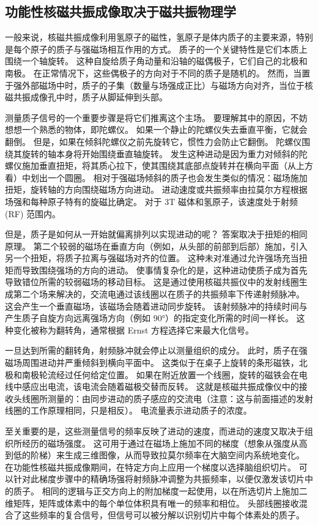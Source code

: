 \subsection{功能性核磁共振成像取决于磁共振物理学}

一般来说，核磁共振成像利用氢原子的磁性，氢原子是体内质子的主要来源，特别是每个原子的质子与强磁场相互作用的方式。
质子的一个关键特性是它们本质上围绕一个轴旋转。
这种自旋给质子角动量和沿轴的磁偶极子，它们自己的北极和南极。
在正常情况下，这些偶极子的方向对于不同的质子是随机的。
然而，当置于强外部磁场中时，质子的子集（数量与场强成正比）与磁场方向对齐，当位于核磁共振成像孔中时，质子从脚延伸到头部。


测量质子信号的一个重要步骤是将它们推离这个主场。 
要理解其中的原因，不妨想想一个熟悉的物体，即陀螺仪。 
如果一个静止的陀螺仪失去垂直平衡，它就会翻倒。 
但是，如果在倾斜陀螺仪之前先旋转它，惯性力会防止它翻倒。 
陀螺仪围绕其旋转的轴本身将开始围绕垂直轴旋转。 
发生这种进动是因为重力对倾斜的陀螺仪施加垂直扭矩，将其质心拉下，使其围绕其底部点旋转并在横向平面（从上方看）中划出一个圆圈。 
相对于强磁场倾斜的质子也会发生类似的情况：磁场施加扭矩，旋转轴的方向围绕磁场方向进动。 
进动速度或共振频率由拉莫尔方程根据场强和每种原子特有的旋磁比确定。 
对于 3T 磁体和氢原子，该速度处于射频 (RF) 范围内。


但是，质子是如何从一开始就偏离排列以实现进动的呢？ 
答案取决于扭矩的相同原理。 
第二个较弱的磁场在垂直方向（例如，从头部的前部到后部）施加，引入另一个扭矩，将质子拉离与强磁场对齐的位置。 
这种未对准通过允许强场充当扭矩而导致围绕强场的方向的进动。 
使事情复杂化的是，这种进动使质子成为首先导致错位所需的较弱磁场的移动目标。
这是通过使用核磁共振仪中的发射线圈生成第二个场来解决的，交流电通过该线圈以在质子的共振频率下传递射频脉冲。 
这会产生一个垂直磁场，该磁场会随着进动同步旋转。 
该射频脉冲的持续时间与产生质子自旋方向远离强场方向（例如 90°）的指定变化所需的时间一样长。 
这种变化被称为翻转角，通常根据 Ernst 方程选择它来最大化信号。


一旦达到所需的翻转角，射频脉冲就会停止以测量组织的成分。
此时，质子在强磁场周围进动并严重倾斜到横向平面中。 
这类似于在桌子上旋转的条形磁铁，北极和南极轮流经过任何给定位置。
如果在附近放置一个线圈，旋转的磁铁会在电线中感应出电流，该电流会随着磁极交替而反转。
这就是核磁共振成像仪中的接收头线圈所测量的：由同步进动的质子感应的交流电（注意：这与前面描述的发射线圈的工作原理相同，只是相反）。
电流量表示进动质子的浓度。


至关重要的是，这些测量信号的频率反映了进动的速度，而进动的速度又取决于组织所经历的磁场强度。
这可用于通过在磁场上施加不同的梯度（想象从强度从高到低的阶梯）来生成三维图像，从而导致拉莫尔频率在大脑空间内系统地变化。
在功能性核磁共振成像期间，在特定方向上应用一个梯度以选择脑组织切片。
可以针对此梯度步骤中的精确场强将射频脉冲调整为共振频率，以便仅激发该切片中的质子。
相同的逻辑与正交方向上的附加梯度一起使用，以在所选切片上施加二维矩阵，矩阵或体素中的每个单位体积具有唯一的频率和相位。
头部线圈接收混合了这些频率的复合信号，但信号可以被分解以识别切片中每个体素处的质子。


